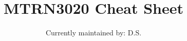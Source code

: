\documentclass[10pt,twocolumn]{article}
\begin{document}
\title{\Huge \bf MTRN3020 Cheat Sheet}
\author{\large Currently maintained by: D.S.}

\maketitle













\printbibliography
\end{document}
